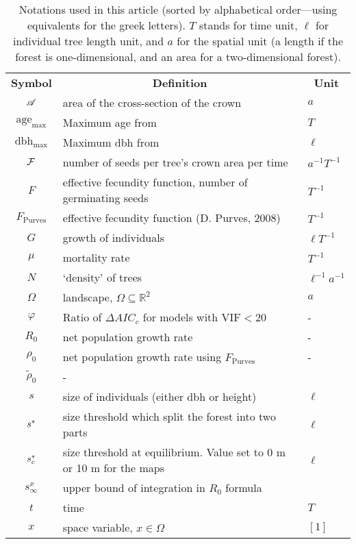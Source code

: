 \begin{table}[h]
	\centering
	\caption{Notations used in this article (sorted by alphabetical order---using equivalents for the greek letters). $ T $ stands for time unit, $ \ell $ for individual tree length unit, and $ a $ for the spatial unit (a length if the forest is one-dimensional, and an area for a two-dimensional forest).} \label{tab::notations}
	\begin{tabular}{@{}cll@{}}
		\toprule
		\textbf{Symbol} & \multicolumn{1}{c}{\textbf{Definition}} & \multicolumn{1}{c}{\textbf{Unit}} \\
		$ \mathscr{A} $ & area of the cross-section of the crown &  $ a $ \\
		$ \text{age}_{\max} $ & Maximum age from \citet{Burns1990, Burns1990a} & $ T $\\
		$ \text{dbh}_{\max} $ & Maximum dbh from \citet{Burns1990, Burns1990a} & $ \ell $\\
		$ \mathcal{F} $ & number of seeds per tree's crown area per time & $ a^{-1} T^{-1} $ \\
		$ F $ & effective fecundity function, \ie number of germinating seeds & $ T^{-1} $ \\
		$ F_{\text{Purves}} $ & effective fecundity function (D. Purves, 2008) & $ T^{-1} $ \\
		$ G $ & growth of individuals & $ \ell T^{-1} $ \\
		$ \mu $ & mortality rate & $ T^{-1} $ \\
		$ N $ & `density' of trees & $ \ell^{-1} a^{-1} $ \\
		$ \Omega $ & landscape, $ \Omega \subseteq \mathds{R}^2 $ & $ a $ \\
		$ \varphi $ & Ratio of $ \Delta AIC_c $ for models with $ \text{VIF} < 20 $ & - \\
		$ R_0 $ & net population growth rate & - \\
		$ \rho_0 $ & net population growth rate using $ F_{\text{Purves}} $ & - \\
		$ \tilde \rho_0 $ & - \\
		$ s $ & size of individuals (either dbh or height) & $ \ell $ \\
		$ {s}^{*} $ & size threshold which split the forest into two parts & $ \ell $ \\
		$ {s}^{*}_c $ & size threshold at equilibrium. Value set to 0 m or 10 m for the maps & $ \ell $ \\
		$ s_{\infty}^{x} $ & upper bound of integration in $ R_0 $ formula & \\
		$ t $ & time & $ T $ \\
		$ x $ & space variable, $ x \in \Omega $ & $ [1] $ \\
		\bottomrule
	\end{tabular}
\end{table}

